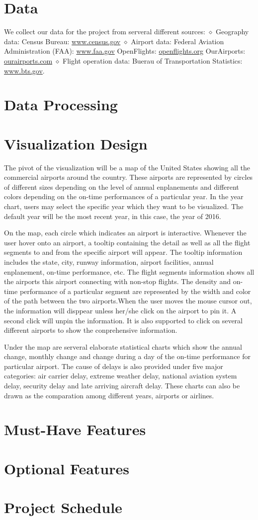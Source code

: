 \documentclass[12pt]{article}
\begin{document}
\section{Data}
    We collect our data for the project from serveral different sources:
    $\diamond$ Geography data:
    Census Bureau: \url{www.census.gov}
    $\diamond$ Airport data: 
    Federal Aviation Administration (FAA): \url{www.faa.gov}
    OpenFlights: \url{openflights.org}
    OurAirports: \url{ourairports.com}
    $\diamond$ Flight operation data: 
    Buerau of Transportation Statistics: \url{www.bts.gov}.
    
\section{Data Processing}

\section{Visualization Design}

The pivot of the visualization will be a map of the United States showing all the commercial airports around the country. These airports are represented by circles of different sizes depending on the level of annual enplanements and different colors depending on the on-time performances of a particular year. In the year chart, users may select the specific year which they want to be visualized. The default year will be the most recent year, in this case, the year of 2016.

On the map, each circle which indicates an airport is interactive. Whenever the user hover onto an airport, a tooltip containing the detail as well as all the flight segments to and from the specific airport will appear. The tooltip information includes the state, city, runway information, airport facilities, annual enplanement, on-time performance, etc. The flight segments information shows all the airports this airport connecting with non-stop flights. The density and on-time performance of a particular segment are represented by the width and color of the path between the two airports.When the user moves the mouse cursor out, the information will disppear unless her/she click on the airport to pin it. A second click will unpin the information. It is also supported to click on several different airports to show the conprehensive information.

Under the map are serveral elaborate statistical charts which show the annual change, monthly change and change during a day of the on-time performance for particular airport. The cause of delays is also provided under five major categories: air carrier delay, extreme weather delay, national aviation system delay, security delay and late arriving aircraft delay. These charts can also be drawn as the comparation among different years, airports or airlines.

\section{Must-Have Features}
\section{Optional Features}
\section{Project Schedule}
\end{document}
